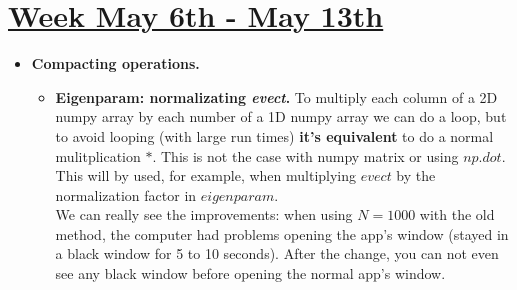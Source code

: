 \documentclass{article}
\begin{document}
\section*{\underline{Week May 6th - May 13th}}
\begin{itemize}
	\item \textbf{Compacting operations.} 
	\begin{itemize}
		\item \textbf{Eigenparam: normalizating \textit{evect}.} To multiply each column of a 2D numpy array by each number of a 1D numpy array we can do a loop, but to avoid looping (with large run times) \textbf{it's equivalent} to do a normal mulitplication $*$. This is not the case with numpy matrix or using $np.dot$. This will by used, for example, when multiplying $evect$ by the normalization factor in $eigenparam$. \\ We can really see the improvements: when using $N = 1000$  with the old method, the computer had problems opening the app's window (stayed in a black window for 5 to 10 seconds). After the change, you can not even see any black window before opening the normal app's window.
		

\end{itemize}
\end{itemize}
\end{document}

